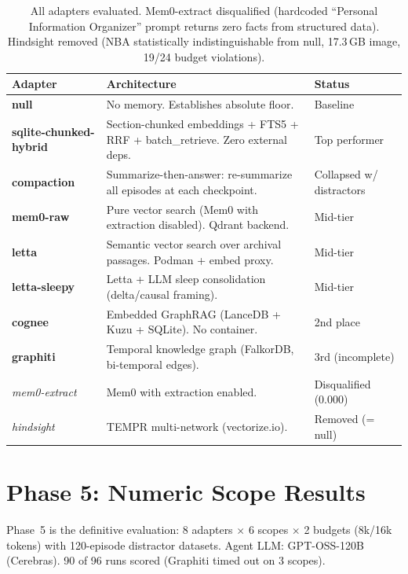 \documentclass[11pt,letterpaper]{article}
\begin{document}
\begin{table}[H]
\centering
\small
\begin{tabularx}{\textwidth}{lXl}
\toprule
\textbf{Adapter} & \textbf{Architecture} & \textbf{Status} \\
\midrule
\textbf{null} & No memory. Establishes absolute floor. & Baseline \\
\textbf{sqlite-chunked-hybrid} & Section-chunked embeddings + FTS5 + RRF + batch\_retrieve. Zero external deps. & \cellcolor{toprow}Top performer \\
\textbf{compaction} & Summarize-then-answer: re-summarize all episodes at each checkpoint. & Collapsed w/ distractors \\
\textbf{mem0-raw} & Pure vector search (Mem0 with extraction disabled). Qdrant backend. & Mid-tier \\
\textbf{letta} & Semantic vector search over archival passages. Podman + embed proxy. & Mid-tier \\
\textbf{letta-sleepy} & Letta + LLM sleep consolidation (delta/causal framing). & Mid-tier \\
\textbf{cognee} & Embedded GraphRAG (LanceDB + Kuzu + SQLite). No container. & 2nd place \\
\textbf{graphiti} & Temporal knowledge graph (FalkorDB, bi-temporal edges). & 3rd (incomplete) \\
\addlinespace
\textit{mem0-extract} & Mem0 with extraction enabled. & \cellcolor{botrow}Disqualified (0.000) \\
\textit{hindsight} & TEMPR multi-network (vectorize.io). & \cellcolor{botrow}Removed (= null) \\
\bottomrule
\end{tabularx}
\caption{All adapters evaluated. Mem0-extract disqualified (hardcoded ``Personal Information Organizer'' prompt returns zero facts from structured data). Hindsight removed (NBA statistically indistinguishable from null, 17.3\,GB image, 19/24 budget violations).}
\label{tab:adapters}
\end{table}

\section{Phase 5: Numeric Scope Results}
\label{sec:phase5}

Phase~5 is the definitive evaluation: 8 adapters $\times$ 6 scopes $\times$ 2 budgets (8k/16k tokens) with 120-episode distractor datasets. Agent LLM: GPT-OSS-120B (Cerebras). 90 of 96 runs scored (Graphiti timed out on 3 scopes).
\end{document}

